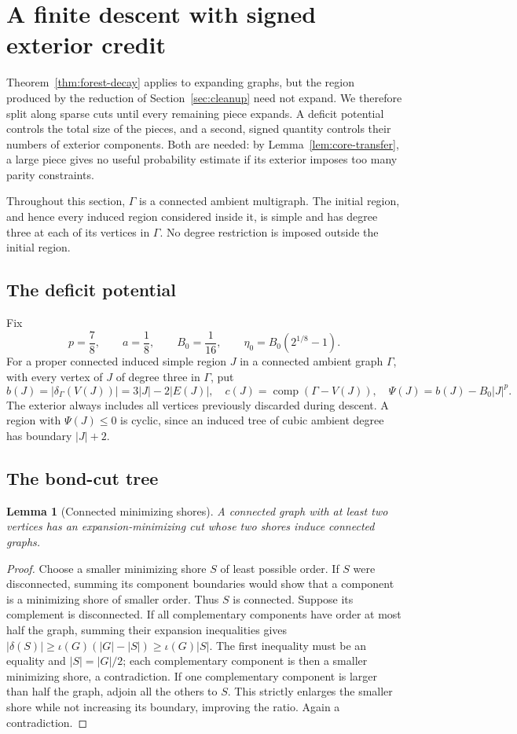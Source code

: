\documentclass[11pt,a4paper]{article}
\numberwithin{equation}{section}
\newtheorem{lemma}[theorem]{Lemma}
\theoremstyle{definition}
\theoremstyle{remark}
\newcommand{\cc}{\operatorname{comp}}
\begin{document}
\section{A finite descent with signed exterior credit}\label{sec:descent}
Theorem~\ref{thm:forest-decay} applies to expanding graphs, but the region produced by the reduction of Section~\ref{sec:cleanup} need not expand. We therefore split along sparse cuts until every remaining piece expands. A deficit potential controls the total size of the pieces, and a second, signed quantity controls their numbers of exterior components. Both are needed: by Lemma~\ref{lem:core-transfer}, a large piece gives no useful probability estimate if its exterior imposes too many parity constraints.

Throughout this section, $\Gamma$ is a connected ambient multigraph. The initial region, and hence every induced region considered inside it, is simple and has degree three at each of its vertices in $\Gamma$. No degree restriction is imposed outside the initial region.

\subsection{The deficit potential}
Fix
\begin{equation}\label{eq:fixed-deficit}
 p=\frac78,\qquad a=\frac18,\qquad B_0=\frac1{16},\qquad
 \eta_0=B_0(2^{1/8}-1).
\end{equation}
For a proper connected induced simple region $J$ in a connected ambient graph $\Gamma$, with every vertex of $J$ of degree three in $\Gamma$, put
\[
 b(J)=|\delta_\Gamma(V(J))|=3|J|-2|E(J)|,
 \quad c(J)=\cc(\Gamma-V(J)),
 \quad\Psi(J)=b(J)-B_0|J|^p.
\]
The exterior always includes all vertices previously discarded during descent. A region with $\Psi(J)\le0$ is cyclic, since an induced tree of cubic ambient degree has boundary $|J|+2$.

\subsection{The bond-cut tree}
\begin{lemma}[Connected minimizing shores]\label{lem:bond}
A connected graph with at least two vertices has an expansion-minimizing cut whose two shores induce connected graphs.
\end{lemma}
\begin{proof}
Choose a smaller minimizing shore $S$ of least possible order. If $S$ were disconnected, summing its component boundaries would show that a component is a minimizing shore of smaller order. Thus $S$ is connected. Suppose its complement is disconnected. If all complementary components have order at most half the graph, summing their expansion inequalities gives
$|\delta(S)|\ge\iota(G)(|G|-|S|)\ge\iota(G)|S|$.
The first inequality must be an equality and $|S|=|G|/2$; each complementary component is then a smaller minimizing shore, a contradiction. If one complementary component is larger than half the graph, adjoin all the others to $S$. This strictly enlarges the smaller shore while not increasing its boundary, improving the ratio. Again a contradiction.
\end{proof}
\end{document}
